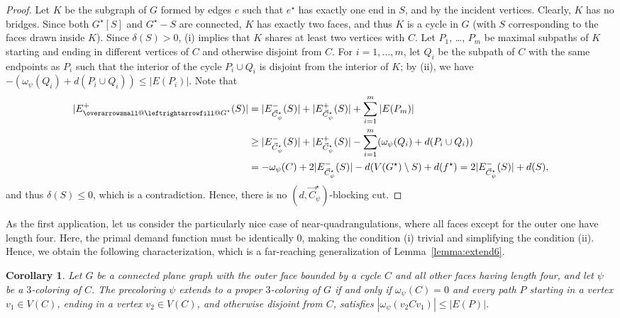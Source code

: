 \documentclass[12pt,twoside,openright,a4paper]{book}
\makeatletter
\newtheorem{corollary}[theorem]{Corollary}
\newcommand{\ovlr}{\mathpalette{\overarrowsmall@\leftrightarrowfill@}}
\newcommand{\overarrowsmall@}[3]{%
  \vbox{%
    \ialign{%
      ##\crcr
      #1{\smaller@style{#2}}\crcr
      \noalign{\nointerlineskip}%
      $\m@th\hfil#2#3\hfil$\crcr
    }%
  }%
}
\def\smaller@style#1{%
  \ifx#1\displaystyle\scriptstyle\else
    \ifx#1\textstyle\scriptstyle\else
      \scriptscriptstyle
    \fi
  \fi
}
\makeatother
\begin{document}
\begin{proof}
Let $K$ be the subgraph of $G$ formed by edges $e$ such that $e^\star$ has exactly one end in $S$, and by the incident vertices.  Clearly, $K$
has no bridges.  Since both $G^\star[S]$ and $G^\star-S$ are connected, $K$ has exactly two faces, and thus $K$ is a cycle in $G$ (with $S$
corresponding to the faces drawn inside $K$).  Since $\delta(S)>0$, (i) implies that $K$ shares at least two vertices with $C$.
Let $P_1$, \ldots, $P_m$ be maximal subpaths of $K$ starting and ending in different vertices of $C$ and otherwise disjoint from $C$.
For $i=1,\ldots,m$, let $Q_i$ be the subpath of $C$ with the same endpoints as $P_i$ such that the interior of the cycle
$P_i\cup Q_i$ is disjoint from the interior of $K$; by (ii), we have $-(\omega_\psi(Q_i)+d(P_i\cup Q_i))\le |E(P_i)|$.
Note that
\begin{align*}
|E_{\ovlr{G^\star}}^+(S)|&=|E_{\vec{C}^\star_\psi}^-(S)|+|E_{\vec{C}^\star_\psi}^+(S)|+\sum_{i=1}^m |E(P_m)|\\
&\ge |E_{\vec{C}^\star_\psi}^-(S)|+|E_{\vec{C}^\star_\psi}^+(S)|-\sum_{i=1}^m (\omega_\psi(Q_i)+d(P_i\cup Q_i))\\
&=-\omega_\psi(C)+2|E_{\vec{C}^\star_\psi}^-(S)|-d(V(G^\star)\setminus S)+d(f^\star)=2|E_{\vec{C}^\star_\psi}^-(S)|+d(S),
\end{align*}
and thus $\delta(S)\le 0$, which is a contradiction.  Hence, there is no $(d,\vec{C}^\star_\psi)$-blocking cut.
\end{proof}

As the first application, let us consider the particularly nice case of near-quadrangulations,
where all faces except for the outer one have length four.  Here, the primal demand function must be
identically $0$, making the condition (i) trivial and simplifying the condition (ii).  Hence, we obtain the following characterization,
which is a far-reaching generalization of Lemma~\ref{lemma:extend6}.

\begin{corollary}\label{cor:flow-quadr}
Let $G$ be a connected plane graph with the outer face bounded by a cycle $C$ and all other faces having length four,
and let $\psi$ be a $3$-coloring of $C$.
The precoloring $\psi$ extends to a proper $3$-coloring of $G$ if and only if $\omega_\psi(C)=0$
and every path $P$ starting in a vertex $v_1\in V(C)$, ending in a vertex $v_2\in V(C)$,
and otherwise disjoint from $C$, satisfies $|\omega_\psi(v_2Cv_1)|\le |E(P)|$.
\end{corollary}
\end{document}
